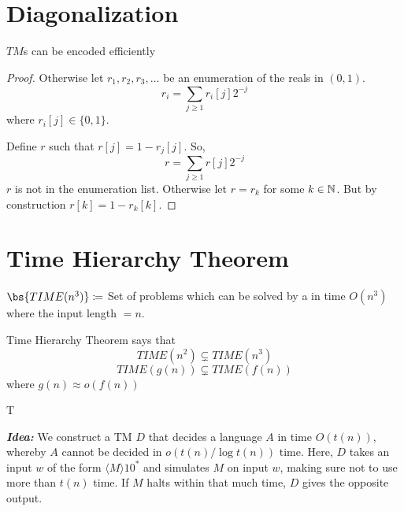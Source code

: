 \documentclass{article}
\begin{document}

\section{Diagonalization}

$TM$s can be encoded efficiently

\begin{proof}
	Otherwise let $r_1,r_2,r_3,\dots$ be an enumeration of the reals in $(0,1)$.
	$$r_i=\sum_{j\geq 1} r_i[j]2^{-j}$$ where $r_i[j]\in \{0,1\}$.  
	
	Define $r$ such that $r[j]=1-r_j[j]$. So, $$r=\sum_{j\geq 1} r[j]2^{-j}$$ $r$ is not in the enumeration list. Otherwise let $r=r_k$ for some $k\in \mathbb{N}$. But by construction $r[k]=1-r_k[k]$. 
\end{proof}


\section{Time Hierarchy Theorem}
\parinf

$\bs{TIME(n^3)}\coloneqq$ Set of problems which can be solved by a \Dtm in time $O(n^3)$ where the input length $=n$.\parinn

Time Hierarchy Theorem says that $$TIME(n^2)\subsetneq TIME(n^3)$$ $$TIME(g(n))\subsetneq TIME(f(n))$$ where $g(n)\approx o(f(n))$

T
	\parinf
	
	\textbf{\textit{Idea:}} We construct a TM $D$ that decides a language $A$ in time $O(t(n))$, whereby $A$ cannot be decided in $o(t(n) / \log t(n))$ time. Here, $D$ takes an input $w$ of the form $\langle M\rangle 10^*$ and simulates $M$ on input $w$, making sure not to use more than $t(n)$ time. If $M$ halts within that much time, $D$ gives the opposite output.\parinn
	
\end{document}
